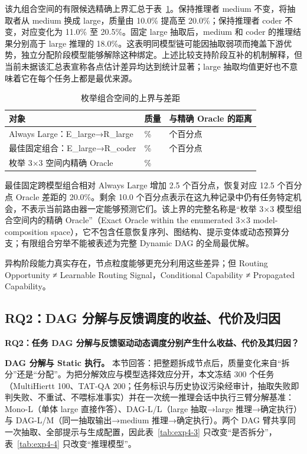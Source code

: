 该九组合空间的有限候选精确上界汇总于表~\ref{tab:exp4-11}。保持推理者 medium 不变，将抽取者从 medium 换成 large，质量由 10.0\% 提高至 20.0\%；保持推理者 coder 不变，对应变化为 11.0\% 至 20.5\%。固定 large 抽取后，medium 和 coder 的推理结果分别高于 large 推理的 18.0\%。这表明同模型链可能因抽取弱项而掩盖下游优势，独立分配阶段模型能够解除这种绑定。上述比较支持阶段互补的机制解释，但当前未据该汇总表宣称各点估计差异均达到统计显著；large 抽取均值更好也不意味着它在每个任务上都是最优来源。

\begin{table}[htbp]
\centering\small
\caption{枚举组合空间的上界与差距}
\label{tab:exp4-11}
\begin{tabular}{@{}>{\raggedright\arraybackslash}p{}>{\raggedright\arraybackslash}p{}>{\raggedright\arraybackslash}p{}@{}}
\toprule
对象 & 质量 & 与精确 Oracle 的距离 \\
\midrule
Always Large：E\_large→R\_large & 18.0\% & 12.5 个百分点 \\
最佳固定组合：E\_large→R\_coder & 20.5\% & 10.0 个百分点 \\
枚举 3×3 空间内精确 Oracle & 30.5\% & 0 \\
\bottomrule
\end{tabular}
\end{table}

最佳固定跨模型组合相对 Always Large 增加 2.5 个百分点，恢复对应 12.5 个百分点 Oracle 差距的 20.0\%。剩余 10.0 个百分点表示在这九种记录中仍有任务特定机会，不表示当前路由器一定能够预测它们。该上界的完整名称是``枚举 3×3 模型组合空间内的精确 Oracle''（Exact Oracle within the enumerated 3×3 model-composition space），它不包含任意恢复序列、图结构、提示变体或动态预算分支；有限组合穷举不能被表述为完整 Dynamic DAG 的全局最优解。

异构阶段能力真实存在，节点粒度能够更充分利用这些差异；但 Routing Opportunity ≠ Learnable Routing Signal，Conditional Capability ≠ Propagated Capability。

\FloatBarrier
\subsection{RQ2：DAG 分解与反馈调度的收益、代价及归因}\label{sec:4-3}

\textbf{RQ2：任务 DAG 分解与反馈驱动动态调度分别产生什么收益、代价及其归因？}

\textbf{DAG 分解与 Static 执行。} 本节回答：把整题拆成节点后，质量变化来自``拆分''还是``分配''。为把分解效应与模型选择效应分开，本文冻结 300 个任务（MultiHiertt 100、TAT-QA 200；任务标识与历史协议污染经审计，抽取失败即判失败、不重试、不喂标准事实）并在一次统一推理会话中执行三臂分解基准：Mono-L（单体 large 直接作答）、DAG-L/L（large 抽取→large 推理→确定执行）与 DAG-L/M（同一抽取输出→medium 推理→确定执行）。两个 DAG 臂共享同一次抽取、全部提示与生成配置，因此表~\ref{tab:exp4-3} 只改变``是否拆分''，表~\ref{tab:exp4-4} 只改变``推理模型''。

